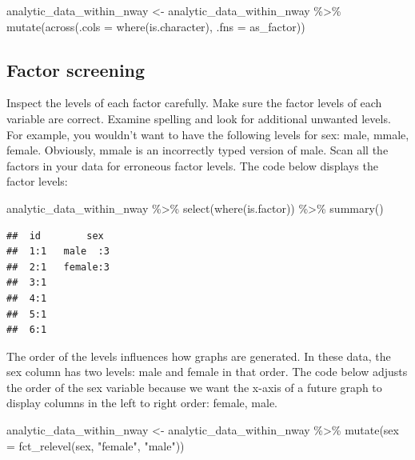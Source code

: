 \documentclass[
]{krantz}
\makeatletter
\newenvironment{Shaded}{\begin{snugshade}}{\end{snugshade}}
\newcommand{\AttributeTok}[1]{\textcolor[rgb]{0.61,0.61,0.61}{#1}}
\newcommand{\FunctionTok}[1]{\textcolor[rgb]{0,0,0}{#1}}
\newcommand{\NormalTok}[1]{#1}
\newcommand{\OtherTok}[1]{\textcolor[rgb]{0.37,0.37,0.37}{#1}}
\newcommand{\SpecialCharTok}[1]{\textcolor[rgb]{0,0,0}{#1}}
\newcommand{\StringTok}[1]{\textcolor[rgb]{0.5,0.5,0.5}{#1}}
\newenvironment{kframe}{%
\medskip{}
\setlength{\fboxsep}{.8em}
 \def\at@end@of@kframe{}%
 \ifinner\ifhmode%
  \def\at@end@of@kframe{\end{minipage}}%
  \begin{minipage}{\columnwidth}%
 \fi\fi%
 \def\FrameCommand##1{\hskip\@totalleftmargin \hskip-\fboxsep
 \colorbox{shadecolor}{##1}\hskip-\fboxsep
     \hskip-\linewidth \hskip-\@totalleftmargin \hskip\columnwidth}%
 \MakeFramed {\advance\hsize-\width
   \@totalleftmargin\z@ \linewidth\hsize
   \@setminipage}}%
 {\par\unskip\endMakeFramed%
 \at@end@of@kframe}
\renewenvironment{Shaded}{\begin{kframe}}{\end{kframe}}
\makeatother
\begin{document}
\begin{Shaded}
\begin{Highlighting}[]
\NormalTok{analytic\_data\_within\_nway }\OtherTok{\textless{}{-}}\NormalTok{ analytic\_data\_within\_nway }\SpecialCharTok{\%\textgreater{}\%}
  \FunctionTok{mutate}\NormalTok{(}\FunctionTok{across}\NormalTok{(}\AttributeTok{.cols =} \FunctionTok{where}\NormalTok{(is.character),}
                \AttributeTok{.fns =}\NormalTok{ as\_factor))}
\end{Highlighting}
\end{Shaded}

\hypertarget{factor-screening-4}{%
\subsection{Factor screening}\label{factor-screening-4}}

Inspect the levels of each factor carefully. Make sure the factor levels of each variable are correct. Examine spelling and look for additional unwanted levels. For example, you wouldn't want to have the following levels for sex: male, mmale, female. Obviously, mmale is an incorrectly typed version of male. Scan all the factors in your data for erroneous factor levels. The code below displays the factor levels:

\begin{Shaded}
\begin{Highlighting}[]
\NormalTok{analytic\_data\_within\_nway }\SpecialCharTok{\%\textgreater{}\%}
  \FunctionTok{select}\NormalTok{(}\FunctionTok{where}\NormalTok{(is.factor)) }\SpecialCharTok{\%\textgreater{}\%}
  \FunctionTok{summary}\NormalTok{()}
\end{Highlighting}
\end{Shaded}

\begin{verbatim}
##  id        sex   
##  1:1   male  :3  
##  2:1   female:3  
##  3:1             
##  4:1             
##  5:1             
##  6:1
\end{verbatim}

The order of the levels influences how graphs are generated. In these data, the sex column has two levels: male and female in that order. The code below adjusts the order of the sex variable because we want the x-axis of a future graph to display columns in the left to right order: female, male.

\begin{Shaded}
\begin{Highlighting}[]
\NormalTok{analytic\_data\_within\_nway }\OtherTok{\textless{}{-}}\NormalTok{ analytic\_data\_within\_nway }\SpecialCharTok{\%\textgreater{}\%}
  \FunctionTok{mutate}\NormalTok{(}\AttributeTok{sex =} \FunctionTok{fct\_relevel}\NormalTok{(sex,}
                           \StringTok{"female"}\NormalTok{,}
                           \StringTok{"male"}\NormalTok{))}
\end{Highlighting}
\end{Shaded}
\end{document}

